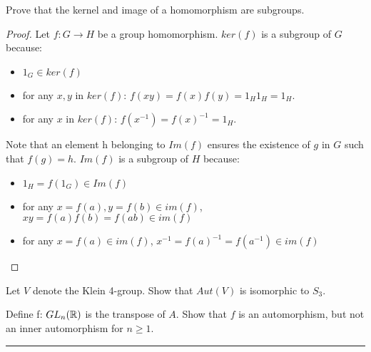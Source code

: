 \begin{boxedProblem}[2.4.3]\label{exo:ker-image}
    Prove that the kernel and image of a homomorphism are subgroups.
\end{boxedProblem}
\begin{proof}
    Let $f:G \longrightarrow H$ be a group homomorphism. $ker(f)$ is a subgroup of $G$ because: \begin{itemize}
        \item $1_G \in ker(f)$
        \item for any $x, y$ in $ker(f)$: $f(xy) = f(x)f(y) = 1_H1_H = 1_H$.
        \item for any $x$ in $ker(f)$: $f(x^{-1}) = f(x)^{-1} = 1_H$.
    \end{itemize}

    Note that an element h belonging to $Im(f)$ ensures the existence of $g$ in $G$ such that $f(g) = h$. $Im(f)$  is a subgroup of $H$ because: \begin{itemize}
        \item $1_H = f(1_G)\in Im(f)$
        \item for any $x=f(a), y=f(b) \in im(f)$, $xy = f(a)f(b) = f(ab) \in im(f)$ 
        \item for any $x=f(a) \in im(f)$, $x^{-1} = f(a)^{-1} = f(a^{-1}) \in im(f)$
    \end{itemize}
\end{proof}

\begin{boxedProblemExtra}
    Let $V$ denote the Klein 4-group. Show that $Aut(V)$ is isomorphic to $S_3$.
\end{boxedProblemExtra}

\begin{boxedProblemExtra}
    Define f: $GL_n(\mathbb{R})$ is the transpose of $A$. Show that $f$ is an automorphism, but not an inner automorphism for $n \geq 1$. 
\end{boxedProblemExtra}
\noindent\rule{\textwidth}{1pt}